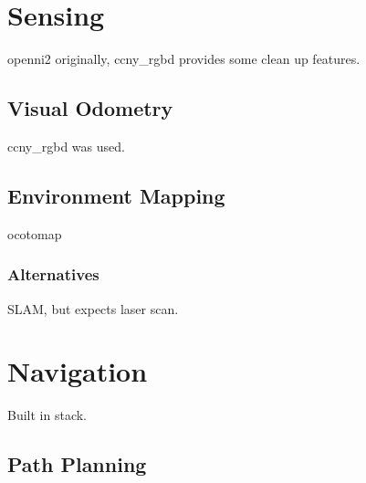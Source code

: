 
\section{Sensing}

openni2 originally, ccny\_rgbd \cite{ccny_rgbd} provides some clean up features.

\subsection{Visual Odometry}

ccny\_rgbd \cite{ccny_rgbd} was used.

\subsection{Environment Mapping}

ocotomap

\subsubsection{Alternatives}

SLAM, but expects laser scan.


\section{Navigation}

Built in stack.

\subsection{Path Planning}
